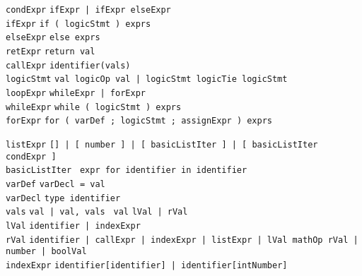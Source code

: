 \documentclass{article}
\newcommand{\keyword}[1]{\colorbox{light-gray}{\texttt{#1}}}
\newcommand{\code}[1]{\texttt{#1}}
\begin{document}
\code{condExpr} \textrightarrow \code{ifExpr | ifExpr elseExpr} \\
\code{ifExpr} \textrightarrow \code{\keyword{if (} logicStmt \keyword{)} exprs } \\
\code{elseExpr} \textrightarrow \code{\keyword{else} exprs} \\
\code{retExpr} \textrightarrow \code{\keyword{return} val} \\
\code{callExpr} \textrightarrow \code{identifier\keyword{(}vals\keyword{)}} \\
\code{logicStmt} \textrightarrow \code{val logicOp val | logicStmt logicTie logicStmt} \\

\code{loopExpr} \textrightarrow \code{whileExpr | forExpr} \\
\code{whileExpr} \textrightarrow \code{\keyword{while (} logicStmt \keyword{)} exprs} \\
\code{forExpr} \textrightarrow \code{\keyword{for (} varDef \keyword{;} logicStmt \keyword{;} assignExpr \keyword{)} exprs}

\code{listExpr} \textrightarrow \code{\keyword{[]} | \keyword{[} number \keyword{]} | \keyword{[} basicListIter \keyword{]} | \keyword{[} basicListIter condExpr \keyword{]} } \\
\code{basicListIter} \textrightarrow \code{ expr \keyword{for} identifier \keyword{in} identifier} \\

\code{varDef} \textrightarrow \code{varDecl \keyword{=} val} \\
\code{varDecl} \textrightarrow \code{type identifier} \\
\code{vals} \textrightarrow \code{val | val, vals }
\code{val} \textrightarrow \code{lVal | rVal} \\
\code{lVal} \textrightarrow \code{identifier | indexExpr} \\
\code{rVal} \textrightarrow \code{identifier | callExpr | indexExpr | listExpr | lVal mathOp rVal | number | boolVal} \\
\code{indexExpr} \textrightarrow \code{identifier\keyword{[}identifier\keyword{]} | identifier\keyword{[}intNumber\keyword{]}} \\
\end{document}
